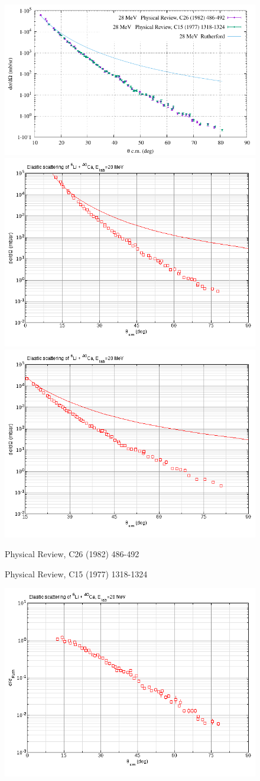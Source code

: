 \documentclass[a4paper, 12pt]{article}
\begin{document}
\begin{figure}%
	\centering
	\includegraphics[width=\linewidth]{figures/cmp-28mev-abs.pdf}
	\includegraphics[width=.49\linewidth]{figures/008-28mev-abs.png}
	\includegraphics[width=.49\linewidth]{figures/003-28mev-abs.png}
	\parbox{.49\linewidth}{\small\centering Physical Review, C26 (1982) 486-492}
	\parbox{.49\linewidth}{\small\centering Physical Review, C15 (1977) 1318-1324}
	\includegraphics[width=.49\linewidth]{figures/008-28mev-ratio.png}

\end{figure}
\end{document}

